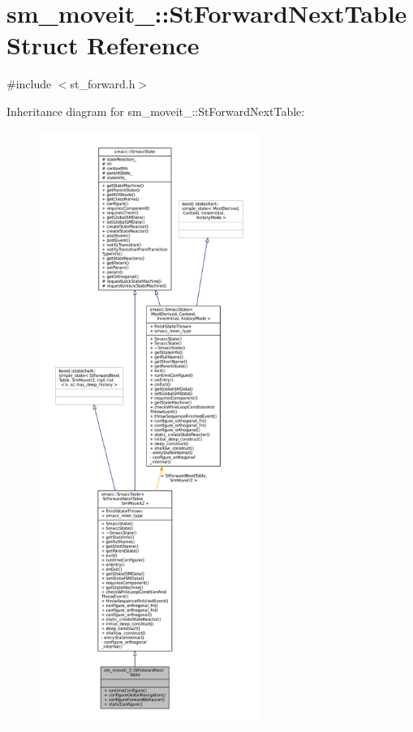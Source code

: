 \hypertarget{structsm__moveit__2_1_1StForwardNextTable}{}\section{sm\+\_\+moveit\+\_\+:\+:St\+Forward\+Next\+Table Struct Reference}
\label{structsm__moveit__2_1_1StForwardNextTable}


{\ttfamily \#include $<$st\+\_\+forward.\+h$>$}



Inheritance diagram for sm\+\_\+moveit\+\_\+:\+:St\+Forward\+Next\+Table\+:
\nopagebreak
\begin{figure}[H]
\begin{center}
\leavevmode
\includegraphics[height=550pt]{structsm__moveit__2_1_1StForwardNextTable__inherit__graph}
\end{center}
\end{figure}


